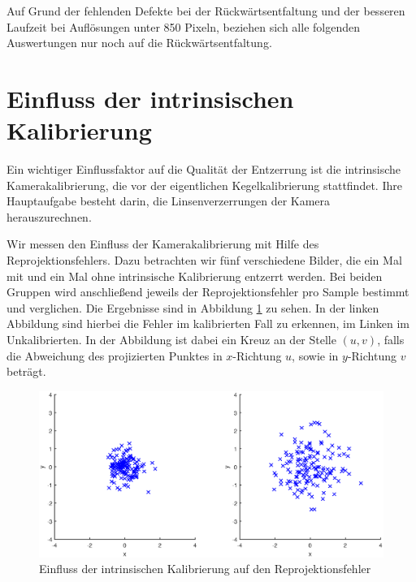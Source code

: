 Auf Grund der fehlenden Defekte bei der Rückwärtsentfaltung und der besseren Laufzeit bei Auflösungen unter 850 Pixeln, beziehen sich alle folgenden Auswertungen nur noch auf die Rückwärtsentfaltung.


\section{Einfluss der intrinsischen Kalibrierung}
Ein wichtiger Einflussfaktor auf die Qualität der Entzerrung ist die intrinsische Kamerakalibrierung, die vor der eigentlichen Kegelkalibrierung stattfindet. Ihre Hauptaufgabe besteht darin, die Linsenverzerrungen der Kamera herauszurechnen. 

Wir messen den Einfluss der Kamerakalibrierung mit Hilfe des Reprojektionsfehlers. Dazu betrachten wir fünf verschiedene Bilder, die ein Mal mit und ein Mal ohne intrinsische Kalibrierung entzerrt werden. Bei beiden Gruppen wird anschließend jeweils der Reprojektionsfehler pro Sample bestimmt und verglichen. Die Ergebnisse sind in Abbildung \ref{fig:influenceCalib} zu sehen. In der linken Abbildung sind hierbei die Fehler im kalibrierten Fall zu erkennen, im Linken im Unkalibrierten. In der Abbildung ist dabei ein Kreuz an der Stelle $(u,v)$, falls die Abweichung des projizierten Punktes in $x$-Richtung $u$, sowie in $y$-Richtung $v$ beträgt. 

\begin{figure}[!htb]
	\centering
	\includegraphics[width=\textwidth]{images/reprojectionErrorReverse.eps}
	\caption{Einfluss der intrinsischen Kalibrierung auf den Reprojektionsfehler}
	\label{fig:influenceCalib}
\end{figure}



